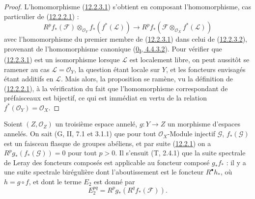 \begin{proof}
L'homomorphisme (\hyperref[0.12.2.3.1-fr]{12.2.3.1}) s'obtient en composant
l'homomorphisme, cas particulier de
(\hyperref[0.12.2.2.1-fr]{12.2.2.1}) :
\[
\label{0.12.2.3.2-fr}
\tag{12.2.3.2}
R^p f_*(\mathcal F)\otimes_{\mathcal O_Y}f_*(f^*(\mathcal L))
\longrightarrow
R^p f_*(\mathcal F\otimes_{\mathcal O_X}f^*(\mathcal L))
\]
avec l'homomorphisme du premier membre de
(\hyperref[0.12.2.3.1-fr]{12.2.3.1}) dans celui de
(\hyperref[0.12.2.3.2-fr]{12.2.3.2}), provenant de l'homomorphisme canonique
(\hyperref[0.4.4.3.2-fr]{0\textsubscript{I}, 4.4.3.2}). Pour vérifier que
(\hyperref[0.12.2.3.1-fr]{12.2.3.1}) est un isomorphisme lorsque $\mathcal L$
est localement libre, on peut aussitôt se ramener au cas
$\mathcal L=\mathcal O_Y$, la question étant locale sur $Y$, et les foncteurs
envisagés étant additifs en $\mathcal L$. Mais alors, la proposition se
ramène, vu la définition de (\hyperref[0.12.2.2.1-fr]{12.2.2.1}), à la
vérification du fait que l'homomorphisme correspondant de préfaisceaux est
bijectif, ce qui est immédiat en vertu de la relation
$f^*(\mathcal O_Y)=\mathcal O_X$.
\end{proof}

\begin{env}[12.2.4]
\label{0.12.2.4-fr}
Soient $(Z,\mathcal O_Z)$ un troisième espace annelé, $g:Y\to Z$ un
morphisme d'espaces annelés. On sait (G, II, 7.1 et 3.1.1) que pour tout
$\mathcal O_X$-Module injectif $\mathcal G$, $f_*(\mathcal G)$ est un
faisceau flasque de groupes abéliens, et par suite
(\hyperref[0.12.2.1-fr]{12.2.1}) on a
$R^p g_*(f_*(\mathcal G))=0$ pour tout $p>0$. Il s'ensuit (T, 2.4.1) que la
suite spectrale de Leray des foncteurs composés est applicable au foncteur
composé $g_*f_*$ : il y a une suite spectrale birégulière dont
l'aboutissement est le foncteur $R^\bullet h_*$, où $h=g\circ f$, et dont le
terme $E_2$ est donné par
\[
\label{0.12.2.4.1-fr}
\tag{12.2.4.1}
E_2^{pq}=R^p g_*(R^q f_*(\mathcal F)).
\]
\end{env}

